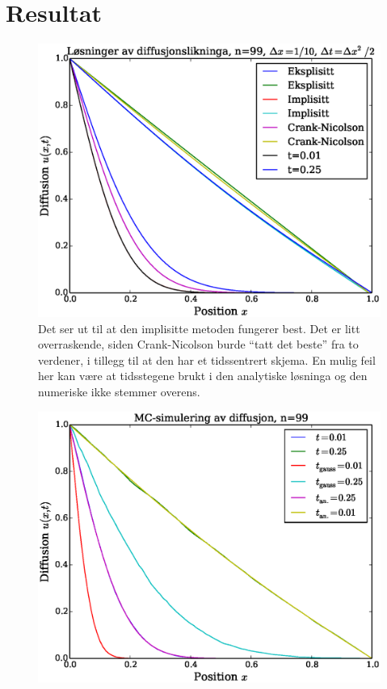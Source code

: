 \documentclass[norsk, 10pt]{article}
\begin{document}

\section*{Resultat}
\begin{figure}[H]
\centerline{\includegraphics[scale = 0.5]{oppgave_d.eps}}
\caption{Det ser ut til at den implisitte metoden fungerer best. Det er litt overraskende, siden Crank-Nicolson burde ``tatt det beste'' fra to verdener, i tillegg til at den har et tidssentrert skjema. En mulig feil her kan være at tidsstegene brukt i den analytiske løsninga og den numeriske ikke stemmer overens.}
\label{fig:analnum}
\end{figure}

\begin{figure}[H]
\centerline{\includegraphics[scale = 0.5]{MC_walk.eps}}
\caption{}
\label{fig:analMC}
\end{figure}
\end{document}
